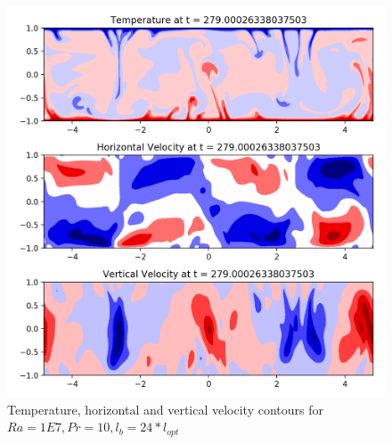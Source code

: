 \documentclass[12pt]{article}
\begin{document}
     
     \begin{figure}[!htb]
     	\includegraphics[width=\linewidth]{contours_1E7_10_24.png}
     	\caption{Temperature, horizontal and vertical velocity contours for $Ra = 1E7, Pr =10, l_b = 24* l_{opt} $ }
     	\label{fig:fig21}
     \end{figure}
     
\end{document}
